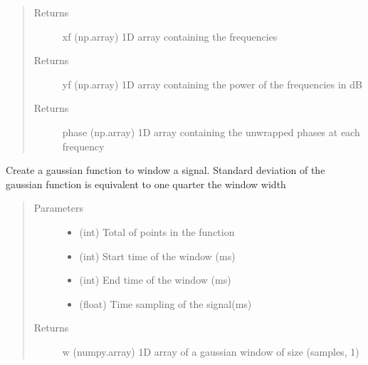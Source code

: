 \documentclass[letterpaper,10pt,english]{sphinxmanual}
\begin{document}
\begin{fulllineitems}
\begin{quote}
\begin{description}
\item[{Returns}] \leavevmode
xf          (np.array)  1D array containing the frequencies

\item[{Returns}] \leavevmode
yf          (np.array)  1D array containing the power of the frequencies in dB

\item[{Returns}] \leavevmode
phase       (np.array)  1D array containing the unwrapped phases at each frequency

\end{description}\end{quote}

\end{fulllineitems}


\begin{fulllineitems}
\label{\detokenize{index:fullwaveqc.siganalysis.gausswindow}}
Create a gaussian function to window a signal. Standard deviation of the gaussian function is equivalent to one
quarter the window width
\begin{quote}\begin{description}
\item[{Parameters}] \leavevmode\begin{itemize}
\item {} 
 \textendash{} (int) Total of points in the function

\item {} 
 \textendash{} (int) Start time of the window (ms)

\item {} 
 \textendash{} (int) End time of the window (ms)

\item {} 
 \textendash{} (float) Time sampling of the signal(ms)

\end{itemize}

\item[{Returns}] \leavevmode
w        (numpy.array) 1D array of a gaussian window of size (samples, 1)

\end{description}\end{quote}

\end{fulllineitems}
\end{document}
